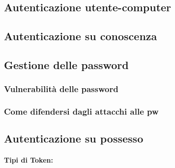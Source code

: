 \subsection{Autenticazione utente-computer}

\subsection{Autenticazione su conoscenza}

\subsection{Gestione delle password}

\subsubsection{Vulnerabilità delle password}

\subsubsection{Come difendersi dagli attacchi alle pw}

\subsection{Autenticazione su possesso}

\paragraph{Tipi di Token: }

